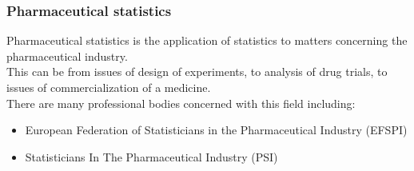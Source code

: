 \documentclass[compress]{beamer}        %
\begin{document}
	
	\begin{frame}
		\frametitle{Pharmaceutical statistics}
		\large
		Pharmaceutical statistics is the application of statistics to matters concerning the pharmaceutical industry. \\ \bigskip
		This can be from issues of design of experiments, to analysis of drug trials, to issues of commercialization of a medicine.\\ \bigskip
		There are many professional bodies concerned with this field including:
		\begin{itemize} 
			\item European Federation of Statisticians in the Pharmaceutical Industry (EFSPI)
			\item Statisticians In The Pharmaceutical Industry (PSI)
		\end{itemize}
\end{frame}
		
\end{document}
